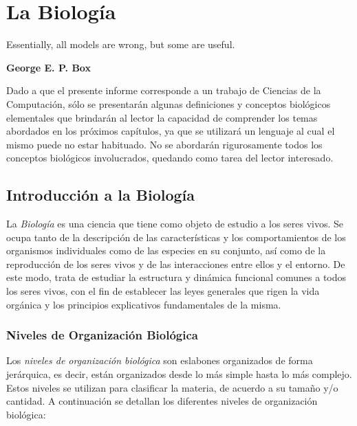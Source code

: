 \chapter{La Biología}
\label{biologia}

\epigraph{Essentially, all models are wrong,
but some are useful.}%
{\textbf{George E. P. Box}}

\par Dado a que el presente informe corresponde a un trabajo de Ciencias de la Computación, sólo se presentarán algunas definiciones y conceptos biológicos elementales que brindarán al lector la capacidad de comprender los temas abordados en los próximos capítulos, ya que se utilizará un lenguaje al cual el mismo puede no estar habituado. No se abordarán rigurosamente todos los conceptos biológicos involucrados, quedando como tarea del lector interesado.

\section{Introducción a la Biología}

\par La \emph{Biología} es una ciencia que tiene como objeto de estudio a los seres vivos. Se ocupa tanto de la descripción de las características y los comportamientos de los organismos individuales como de las especies en su conjunto, así como de la reproducción de los seres vivos y de las interacciones entre ellos y el entorno. De este modo, trata de estudiar la estructura y dinámica funcional comunes a todos los seres vivos, con el fin de establecer las leyes generales que rigen la vida orgánica y los principios explicativos fundamentales de la misma\cite{curtis}. 

\subsection{Niveles de Organización Biológica}
\par Los \emph{niveles de organización biológica} son eslabones organizados de forma jerárquica, es decir, están organizados desde lo más simple hasta lo más complejo. Estos niveles se utilizan para clasificar la materia, de acuerdo a su tamaño y/o cantidad. A continuación se detallan los diferentes niveles de organización biológica:

